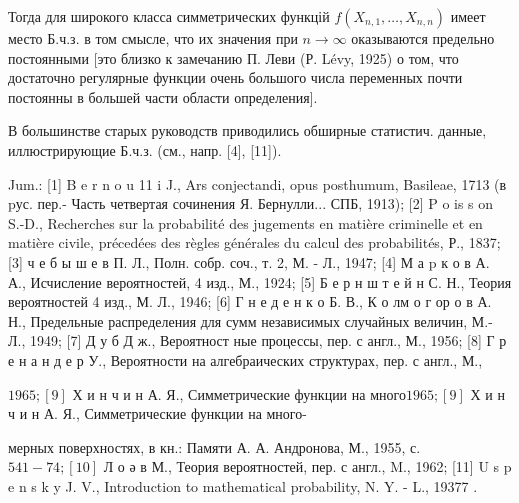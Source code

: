 \documentclass[10pt]{article}
\begin{document}
Тогда для широкого класса симметрических функцій $f\left(X_{n, 1}, \ldots, X_{n, n}\right)$ имеет место Б.ч.з. в том смысле, что их значения при $n \rightarrow \infty$ оказываются предельно постоянными [это близко к замечанию П. Леви (Р. Lévy, 1925) о том, что достаточно регулярные функции очень большого числа переменных почти постоянны в большей части области определения].



В большинстве старых руководств приводились обширные статистич. данные, иллюстрирующие Б.ч.з. (см., напр. [4], [11]).



Jum.: [1] B e r n o u 11 i J., Ars conjectandi, opus posthumum, Basileae, 1713 (в pус. пер.- Часть четвертая сочинения Я. Бернулли... СПБ, 1913); [2] P o is s on S.-D., Recherches sur la probabilité des jugements en matière criminelle et en matière civile, précedées des règles générales du calcul des probabilités, Р., 1837; [3] ч е б ы ш е в П. Л., Полн. собр. соч., т. 2, М. - Л., 1947; [4] М а p к о в А. А., Исчисление вероятностей, 4 изд., М., 1924; [5] Б е р н ш т е й н С. Н., Теория вероятностей 4 изд., М. Л., 1946; [6] Г н е д е н к о Б. В., К о лм о г ор о в А. Н., Предельные распределения для сумм независимых случайных величин, М.- Л., 1949; [7] Д у б Д ж., Вероятност ные процессы, пер. с англ., М., 1956; [8] Г р е н а н д е р У., Вероятности на алгебраических структурах, пер. с англ., М.,

$1965 ;[9]$ Х и н ч и н А. Я., Симметрические функции на много$1965 ;[9]$ Х и н ч и н А. Я., Симметрические функции на много-

мерных поверхностях, в кн.: Памяти А. А. Андронова, М., 1955, с. $541-74 ;[10]$ Л о ә в М., Теория вероятностей, пер. с англ., M., 1962; [11] U s p e n s k y J. V., Introduction to mathematical probability, N. Y. - L., 19377 .
\end{document}
